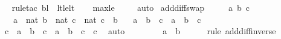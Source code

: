 \begin{isabellebody}
%
\isadelimproof
\ \ %
\endisadelimproof
%
\isatagproof
{}\isamarkupfalse%
{\isacharparenleft}{\kern0pt}rule{\isacharunderscore}{\kern0pt}tac\ b{\isacharequal}{\kern0pt}l\ \ lt{\isacharunderscore}{\kern0pt}le{\isacharunderscore}{\kern0pt}lt{\isacharparenright}{\kern0pt}\isanewline
\ \ \isamarkupfalse%
\ max{\isacharunderscore}{\kern0pt}le{}\ \isanewline
\ \ \isamarkupfalse%
\ auto%
\endisatagproof
{\isafoldproof}%
%
\isadelimproof
\isanewline
%
\endisadelimproof
\isanewline
\isanewline
{}\isamarkupfalse%
\ add{\isacharunderscore}{\kern0pt}diff{\isacharunderscore}{\kern0pt}swap\ {\isacharcolon}{\kern0pt}\ \isanewline
\ \ \ a\ b\ c\ \isanewline
\ \ \ {\isachardoublequoteopen}a\ {\isasymin}\ nat{\isachardoublequoteclose}\ {\isachardoublequoteopen}b\ {\isasymin}\ nat{\isachardoublequoteclose}\ {\isachardoublequoteopen}c\ {\isasymin}\ nat{\isachardoublequoteclose}\ {\isachardoublequoteopen}c\ {\isasymle}\ b{\isachardoublequoteclose}\isanewline
\ \ \ {\isachardoublequoteopen}a\ {\isacharhash}{\kern0pt}{\isacharplus}{\kern0pt}\ b\ {\isacharhash}{\kern0pt}{\isacharminus}{\kern0pt}\ c\ {\isacharequal}{\kern0pt}\ a\ {\isacharhash}{\kern0pt}{\isacharplus}{\kern0pt}\ {\isacharparenleft}{\kern0pt}b\ {\isacharhash}{\kern0pt}{\isacharminus}{\kern0pt}\ c{\isacharparenright}{\kern0pt}{\isachardoublequoteclose}\isanewline
%
\isadelimproof
%
\endisadelimproof
%
\isatagproof
{}\isamarkupfalse%
\ {\isacharminus}{\kern0pt}\ \isanewline
\ \ \isamarkupfalse%
\ {\isachardoublequoteopen}c\ {\isacharhash}{\kern0pt}{\isacharplus}{\kern0pt}\ {\isacharparenleft}{\kern0pt}a\ {\isacharhash}{\kern0pt}{\isacharplus}{\kern0pt}\ b\ {\isacharhash}{\kern0pt}{\isacharminus}{\kern0pt}\ c{\isacharparenright}{\kern0pt}\ {\isacharequal}{\kern0pt}\ {\isacharparenleft}{\kern0pt}a\ {\isacharhash}{\kern0pt}{\isacharplus}{\kern0pt}\ b\ {\isacharhash}{\kern0pt}{\isacharminus}{\kern0pt}\ c{\isacharparenright}{\kern0pt}\ {\isacharhash}{\kern0pt}{\isacharplus}{\kern0pt}\ c{\isachardoublequoteclose}\ \isamarkupfalse%
\ auto\ \isanewline
\ \ \isamarkupfalse%
\ \isamarkupfalse%
\ {\isachardoublequoteopen}{\isachardot}{\kern0pt}{\isachardot}{\kern0pt}{\isachardot}{\kern0pt}\ {\isacharequal}{\kern0pt}\ a\ {\isacharhash}{\kern0pt}{\isacharplus}{\kern0pt}\ b{\isachardoublequoteclose}\ \isanewline
\ \ \ \ \isamarkupfalse%
{\isacharparenleft}{\kern0pt}rule\ add{\isacharunderscore}{\kern0pt}diff{\isacharunderscore}{\kern0pt}inverse{}{\isacharparenright}{\kern0pt}\isanewline

\end{isabellebody}
